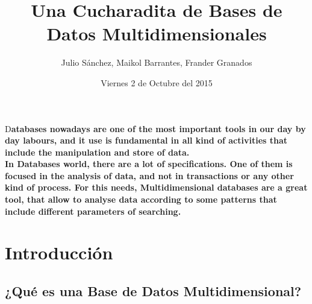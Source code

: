 \documentclass[DIV=calc, paper=a4, fontsize=11pt, twocolumn]{scrartcl}	 %
\title{Una Cucharadita de Bases de Datos Multidimensionales} %
\author{Julio S\'{a}nchez, Maikol Barrantes, Frander Granados } %
\date{Viernes 2 de Octubre del 2015} %
\newcommand{\initial}[1]{ %
\lettrine[lines=3,lhang=0.3,nindent=0em]{
\color{DarkGoldenrod}
{\textsf{#1}}}{}}
\begin{document}
\maketitle %

\thispagestyle{fancy} %


\initial{D}\textbf{atabases nowadays are one of the most important tools in our day by day labours, and it use is fundamental in all kind of activities that include the manipulation and store of data.\\
In Databases world, there are a lot of specifications. One of them is focused in the analysis of data, and not in transactions or any other kind of process. For this needs, Multidimensional databases are a great tool, that allow to analyse data according to some patterns that include different parameters of searching.}


\section*{Introducci\'{o}n}

\subsection*{¿Qu\'{e} es una Base de Datos Multidimensional?}
\end{document}
